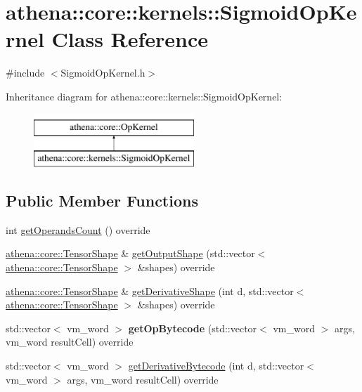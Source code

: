 \hypertarget{classathena_1_1core_1_1kernels_1_1_sigmoid_op_kernel}{}\section{athena\+:\+:core\+:\+:kernels\+:\+:Sigmoid\+Op\+Kernel Class Reference}
\label{classathena_1_1core_1_1kernels_1_1_sigmoid_op_kernel}


{\ttfamily \#include $<$Sigmoid\+Op\+Kernel.\+h$>$}

Inheritance diagram for athena\+:\+:core\+:\+:kernels\+:\+:Sigmoid\+Op\+Kernel\+:\begin{figure}[H]
\begin{center}
\leavevmode
\includegraphics[height=2.000000cm]{classathena_1_1core_1_1kernels_1_1_sigmoid_op_kernel}
\end{center}
\end{figure}
\subsection*{Public Member Functions}
\begin{DoxyCompactItemize}
\item 
int \mbox{\hyperlink{classathena_1_1core_1_1kernels_1_1_sigmoid_op_kernel_acb639510462e759a92747cec8c32358b}{get\+Operands\+Count}} () override
\item 
\mbox{\hyperlink{classathena_1_1core_1_1_tensor_shape}{athena\+::core\+::\+Tensor\+Shape}} \& \mbox{\hyperlink{classathena_1_1core_1_1kernels_1_1_sigmoid_op_kernel_abd929f41de55a4898a0fce70025c1499}{get\+Output\+Shape}} (std\+::vector$<$ \mbox{\hyperlink{classathena_1_1core_1_1_tensor_shape}{athena\+::core\+::\+Tensor\+Shape}} $>$ \&shapes) override
\item 
\mbox{\hyperlink{classathena_1_1core_1_1_tensor_shape}{athena\+::core\+::\+Tensor\+Shape}} \& \mbox{\hyperlink{classathena_1_1core_1_1kernels_1_1_sigmoid_op_kernel_a0ea18b43eb9355d7a855202898ff09fc}{get\+Derivative\+Shape}} (int d, std\+::vector$<$ \mbox{\hyperlink{classathena_1_1core_1_1_tensor_shape}{athena\+::core\+::\+Tensor\+Shape}} $>$ \&shapes) override
\item 
\mbox{\label{classathena_1_1core_1_1kernels_1_1_sigmoid_op_kernel_a728bbcf1fce2ae1173f45119ae0898fc}} 
std\+::vector$<$ vm\+\_\+word $>$ {\bfseries get\+Op\+Bytecode} (std\+::vector$<$ vm\+\_\+word $>$ args, vm\+\_\+word result\+Cell) override
\item 
std\+::vector$<$ vm\+\_\+word $>$ \mbox{\hyperlink{classathena_1_1core_1_1kernels_1_1_sigmoid_op_kernel_a38166ae2204692353efa2f6270714a80}{get\+Derivative\+Bytecode}} (int d, std\+::vector$<$ vm\+\_\+word $>$ args, vm\+\_\+word result\+Cell) override
\end{DoxyCompactItemize}
